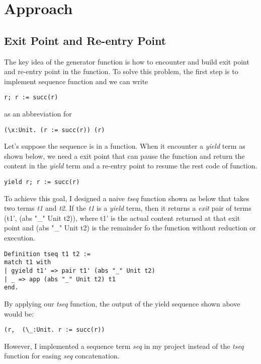 \section{Approach}

\subsection{Exit Point and Re-entry Point}
The key idea of the generator function is how to encounter and build exit point and re-entry point in the function. 
To solve this problem, the first step is to implement sequence function and we can write
\begin{lstlisting}[basicstyle=\small]
r; r := succ(r)
\end{lstlisting}
as an abbreviation for 
\begin{lstlisting}[basicstyle=\small]
(\x:Unit. (r := succ(r)) (r)
\end{lstlisting}
Let's suppose the sequence is in a function. When it encounter a \textit{yield} term as shown below, we need a exit point that can pause the function and return the content in the \textit{yield} term and a re-entry point to resume the rest code of function.
\begin{lstlisting}[basicstyle=\small]
yield r; r := succ(r)
\end{lstlisting}
To achieve this goal, I designed a naive \textit{tseq} function shown as below that takes two terms \textit{t1} and \textit{t2}. If the \textit{t1} is a \textit{yield} term, then it returns a \textit{exit} pair of terms (t1', (abs "_" Unit t2)), where t1' is the actual content returned at that exit point and (abs "_" Unit t2) is the remainder fo the function without reduction or execution.
\begin{lstlisting}[basicstyle=\small]
Definition tseq t1 t2 := 
match t1 with 
| gyield t1' => pair t1' (abs "_" Unit t2)
| _ => app (abs "_" Unit t2) t1
end.
\end{lstlisting}
By applying our \textit{tseq} function, the output of the yield sequence shown above would be:
\begin{lstlisting}[basicstyle=\small]
(r,  (\_:Unit. r := succ(r))
\end{lstlisting}
However, I implemented a sequence term \textit{seq} in my project instead of the \textit{tseq} function for easing \textit{seq} concatenation.

